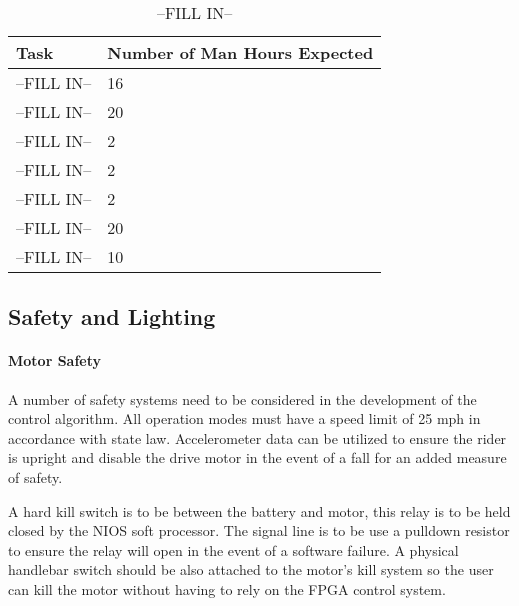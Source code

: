 \documentclass[12pt,article]{IEEEtran}
\begin{document}
        \begin{table}[H]        
            \renewcommand{\arraystretch}{1.3}
        		\caption{--FILL IN--}
    			
    			\label{--FILL IN--}
    			
    			\centering
    			\begin{tabular}{p{4cm}|p{4cm}}
    			\hline
    			\bfseries 	Task 			        	& \bfseries Number of Man Hours Expected        \\
    			\hline\hline
    						--FILL IN-- 		        & 16						    	            \\
    						--FILL IN--    	        	& 20			                                \\	
    						--FILL IN--         	    & 2				                                \\	
    						--FILL IN--             	& 2				                                \\
                            --FILL IN--                 & 2						                        \\
    						--FILL IN--             	& 20			                                \\	
    						--FILL IN--    	            & 10				                            \\	
    				        \hline	
    			\end{tabular}
		\end{table}
        
    \subsection{Safety and Lighting}
        \paragraph{Motor Safety}
        	A number of safety systems need to be considered in the development of the control algorithm. All 
        	operation modes must have a speed limit of 25 mph in accordance with state law. Accelerometer data 
        	can be utilized to ensure the rider is upright and disable the drive motor in the event of a fall 
        	for an added measure of safety.	
    
        	A hard kill switch is to be between the battery and motor, this relay is to be held closed by the NIOS 
        	soft processor. The signal line is to be use a pulldown resistor to ensure the relay will open in the 
        	event of a software failure. A physical handlebar switch should be also attached to the motor's kill 
        	system so the user can kill the motor without having to rely on the FPGA control system.
        
\end{document}
